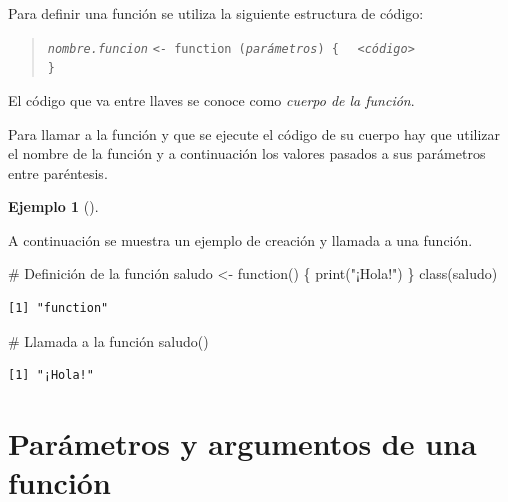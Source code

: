 \documentclass[
  a4paper,
]{scrreport}
\newenvironment{Shaded}{\begin{snugshade}}{\end{snugshade}}
\newcommand{\CommentTok}[1]{\textcolor[rgb]{0.37,0.37,0.37}{#1}}
\newcommand{\ControlFlowTok}[1]{\textcolor[rgb]{0.00,0.23,0.31}{#1}}
\newcommand{\FunctionTok}[1]{\textcolor[rgb]{0.28,0.35,0.67}{#1}}
\newcommand{\NormalTok}[1]{\textcolor[rgb]{0.00,0.23,0.31}{#1}}
\newcommand{\OtherTok}[1]{\textcolor[rgb]{0.00,0.23,0.31}{#1}}
\newcommand{\StringTok}[1]{\textcolor[rgb]{0.13,0.47,0.30}{#1}}
\theoremstyle{definition}
\theoremstyle{definition}
\newtheorem{example}{Ejemplo}[chapter]
\theoremstyle{remark}
\begin{document}
Para definir una función se utiliza la siguiente estructura de código:

\begin{quote}
\emph{\texttt{nombre.funcion}}
\texttt{\textless{}-\ function\ (}\emph{\texttt{parámetros}}\texttt{)\ \{}
  \emph{\texttt{\textless{}código\textgreater{}}}\\
\texttt{\}}
\end{quote}

El código que va entre llaves se conoce como \emph{cuerpo de la
función}.

Para llamar a la función y que se ejecute el código de su cuerpo hay que
utilizar el nombre de la función y a continuación los valores pasados a
sus parámetros entre paréntesis.

\leavevmode{}%
\begin{example}[]\label{exm-creacion-funcion}

A continuación se muestra un ejemplo de creación y llamada a una
función.

\begin{Shaded}
\begin{Highlighting}[]
\CommentTok{\# Definición de la función}
\NormalTok{saludo }\OtherTok{\textless{}{-}} \ControlFlowTok{function}\NormalTok{() \{}
  \FunctionTok{print}\NormalTok{(}\StringTok{"¡Hola!"}\NormalTok{)}
\NormalTok{\}}
\FunctionTok{class}\NormalTok{(saludo)}
\end{Highlighting}
\end{Shaded}

\begin{verbatim}
[1] "function"
\end{verbatim}

\begin{Shaded}
\begin{Highlighting}[]
\CommentTok{\# Llamada a la función}
\FunctionTok{saludo}\NormalTok{()}
\end{Highlighting}
\end{Shaded}

\begin{verbatim}
[1] "¡Hola!"
\end{verbatim}

\end{example}

\hypertarget{paruxe1metros-y-argumentos-de-una-funciuxf3n}{%
\section{Parámetros y argumentos de una
función}\label{paruxe1metros-y-argumentos-de-una-funciuxf3n}}
\end{document}
